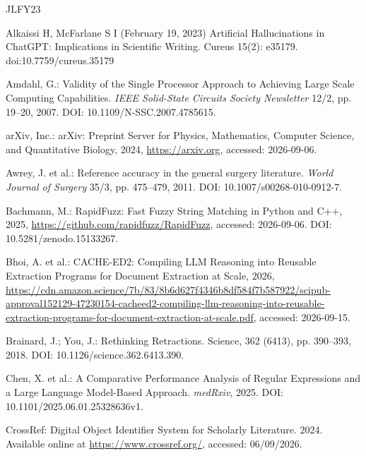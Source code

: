 \documentclass[12pt,a4paper,oneside]{report}
\begin{document}

\newpage
\renewcommand{\bibname}{References}

\begin{thebibliography}{JLFY23}

Alkaissi H, McFarlane S I (February 19, 2023) Artificial Hallucinations in ChatGPT: Implications in Scientific Writing. Cureus 15(2): e35179. doi:10.7759/cureus.35179

Amdahl, G.: Validity of the Single Processor Approach to Achieving Large Scale Computing Capabilities. \textit{IEEE Solid-State Circuits Society Newsletter} 12/2, pp. 19--20, 2007. DOI: 10.1109/N-SSC.2007.4785615.


arXiv, Inc.: arXiv: Preprint Server for Physics, Mathematics, Computer Science, and Quantitative Biology, 2024, \url{https://arxiv.org}, accessed: 2026-09-06.

Awrey, J. et al.: Reference accuracy in the general surgery literature. \textit{World Journal of Surgery} 35/3, pp. 475–479, 2011. DOI: 10.1007/s00268-010-0912-7.

Bachmann, M.: RapidFuzz: Fast Fuzzy String Matching in Python and C++, 2025, \url{https://github.com/rapidfuzz/RapidFuzz}, accessed: 2026-09-06. DOI: 10.5281/zenodo.15133267.

Bhoi, A. et al.: CACHE-ED2: Compiling LLM Reasoning into Reusable Extraction Programs for Document Extraction at Scale, 2026, \url{https://cdn.amazon.science/7b/83/8b6d627f4346b8df584f7b587922/scipub-approval152129-47230154-cacheed2-compiling-llm-reasoning-into-reusable-extraction-programs-for-document-extraction-at-scale.pdf}, accessed: 2026-09-15.

Brainard, J.; You, J.: Rethinking Retractions. Science, 362 (6413), pp. 390--393, 2018. DOI: 10.1126/science.362.6413.390.

Chen, X. et al.: A Comparative Performance Analysis of Regular Expressions and a Large Language Model-Based Approach. \textit{medRxiv}, 2025. DOI: 10.1101/2025.06.01.25328636v1.

CrossRef: Digital Object Identifier System for Scholarly Literature. 2024. Available online at \url{https://www.crossref.org/}, accessed: 06/09/2026.


\end{thebibliography}
\end{document}
